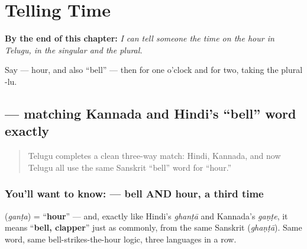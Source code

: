 
\chapter{Telling Time}
\label{ch:te-telling-time}

\begin{chapteropening}
\textbf{By the end of this chapter:} \emph{I can tell someone the time on the hour in Telugu, in the singular and the plural.}

Say  — hour, and also \textquotedblleft{}bell\textquotedblright{} — then   for one o'clock and   for two, taking the plural -lu.
\end{chapteropening}

\section[\texorpdfstring{\te{గంట} (ganṭa)}{గంట (ganṭa)}]{ — matching Kannada and Hindi's \textquotedblleft{}bell\textquotedblright{} word exactly}

\label{lesson:TE-C18-ganta}



\begin{quote}
Telugu completes a clean three-way match: Hindi, Kannada, and now Telugu all use the same Sanskrit \textquotedblleft{}bell\textquotedblright{} word for \textquotedblleft{}hour.\textquotedblright{}
\end{quote}

\subsection*{You'll want to know:  — bell AND hour, a third time}
\textbf{} (\emph{ganṭa}) = \textquotedblleft{}\textbf{hour}\textquotedblright{} — and, exactly like Hindi's \emph{ghanṭā} and Kannada's \emph{gaṇṭe}, it means \textquotedblleft{}\textbf{bell, clapper}\textquotedblright{} just as commonly, from the same Sanskrit \textbf{} (\emph{ghaṇṭā}). Same word, same bell-strikes-the-hour logic, three languages in a row.

